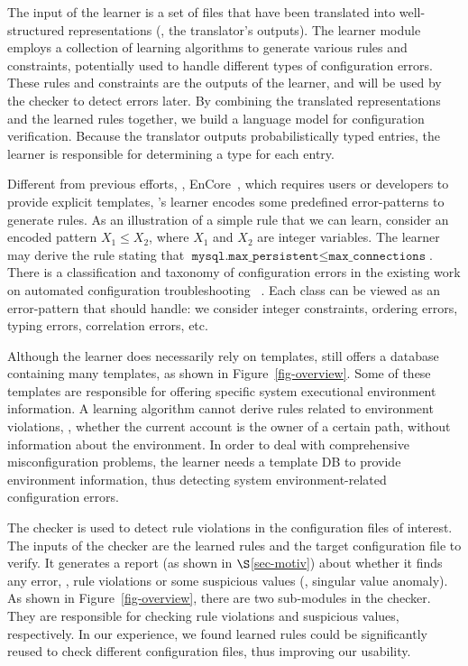The input of the learner is a set of files that have been translated
into well-structured representations (\ie, the translator's
outputs). The learner module employs a collection of learning algorithms
to generate various rules and constraints,
potentially used to handle different types of configuration errors.
These rules and constraints are the outputs of the learner, 
and will be used by the checker to detect errors later.
By combining the translated representations and the learned
rules together, we build a language model for
configuration verification.
Because the translator outputs probabilistically typed entries,
the learner is responsible for determining a type for each entry.

Different from previous efforts, \eg, EnCore~\cite{zhang14encore},
which requires users or developers to provide explicit templates,
\app's learner encodes some predefined error-patterns 
to generate rules. 
As an illustration of a simple rule that we can learn,
consider an encoded pattern $X_1 \le X_2$, where $X_1$ and $X_2$ are
integer variables. The learner may derive the rule stating that
$\texttt{mysql.max\_persistent} \le \texttt{max\_connections}$. 
There is a classification and taxonomy of configuration errors in the 
existing work on automated configuration troubleshooting%
~\cite{yin11anempirical, configdataset}. 
Each class can be viewed as an error-pattern 
that \app should handle: we consider integer constraints, 
ordering errors, typing errors, correlation errors, etc.

Although the learner does necessarily rely on templates,
\app still offers a database containing many templates,
as shown in Figure~\ref{fig-overview}.
Some of these templates are responsible for offering
specific system executional environment information.
A learning algorithm cannot derive rules 
related to environment violations, \eg,
whether the current account is 
the owner of a certain path, without information 
about the environment. 
In order to deal with comprehensive misconfiguration problems,
the learner needs a template DB to provide environment information,
thus detecting system environment-related configuration errors.

The checker is used to detect rule violations in the configuration
files of interest. The inputs of the checker are the learned rules 
and the target configuration file to verify.
It generates a report (as shown in $\S$\ref{sec-motiv}) about 
whether it finds any error, \eg, rule violations 
or some suspicious values (\eg, singular value anomaly).
As shown in Figure~\ref{fig-overview},
there are two sub-modules in the checker. They are responsible for
checking rule violations and suspicious values, respectively.
In our experience, we found learned rules could be significantly reused
to check different configuration files, thus improving our usability.  
